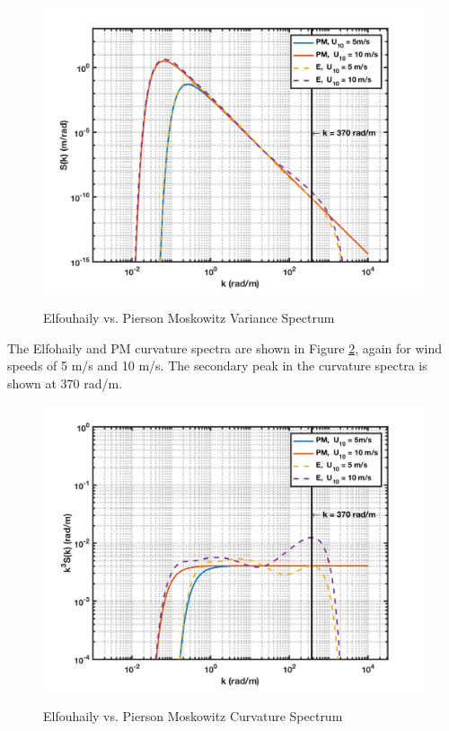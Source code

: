 \begin{figure}[H]
  \begin{center}
\includegraphics[width=5in]{../media/elf_vs_PM_variance_spectrum.png}
  \end{center}
  \renewcommand{\baselinestretch}{1} \small\normalsize
  \begin{quote}
    \caption[Elfouhaily vs. Pierson Moskowitz Variance Spectrum]{Elfouhaily vs. Pierson Moskowitz Variance Spectrum\label{os_fig:3}}
  \end{quote}
\end{figure}
\renewcommand{\baselinestretch}{2} \small\normalsize

The Elfohaily and PM curvature spectra are shown in Figure \ref{os_fig:4}, again for wind speeds of 5 m/s and 10 m/s. The secondary peak in the curvature spectra is shown at 370 rad/m.

\begin{figure}[H]
  \begin{center}
\includegraphics[width=5in]{../media/elf_vs_PM_curvature_spectrum.png}
  \end{center}
  \renewcommand{\baselinestretch}{1} \small\normalsize
  \begin{quote}
    \caption[Elfouhaily vs. Pierson Moskowitz Curvature Spectrum]{Elfouhaily vs. Pierson Moskowitz Curvature Spectrum\label{os_fig:4}}
  \end{quote}
\end{figure}
\renewcommand{\baselinestretch}{2} \small\normalsize

